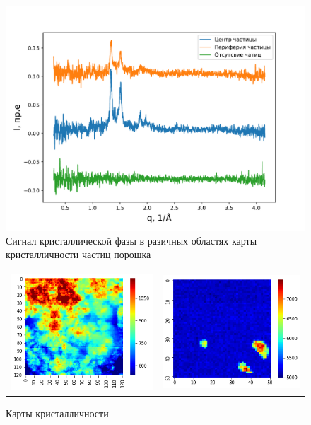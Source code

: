 \begin{figure}[h]
    \centering
    \includegraphics[width = \linewidth]{fig/var-profile.pdf}
    \caption{Сигнал кристаллической фазы в разичных областях карты кристалличности частиц порошка}
    \label{fig:var-profile}
\end{figure}

	
		\begin{figure}[h]\centering
\begin{tabular}{cc}
\includegraphics[width=0.5\linewidth]{fig/example72.png}
&
\includegraphics[width=0.5\linewidth]{fig/example1434.png} \\
\end{tabular}
\caption{Карты кристалличности}
\label{fig:maps_powder}
\end{figure}
	
	
	
